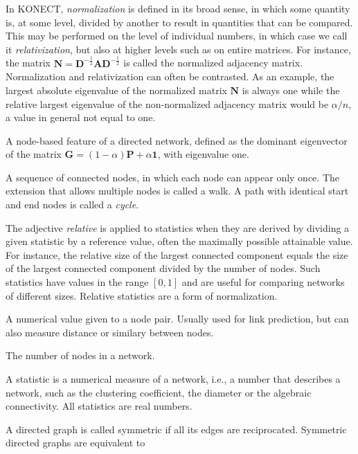 \documentclass{article}
\begin{document}
\begin{description}
    In KONECT, \emph{normalization} is defined in its broad sense, in
    which some quantity is, at some level, divided by another to result
    in quantities that can be compared.  This may be performed on the
    level of individual numbers, in which case we call it
    \emph{relativization}, but also at higher levels such as on entire
    matrices.  For instance, the matrix $\mathbf N = \mathbf D^{-\frac 1 2}
    \mathbf A \mathbf D^{-\frac 1 2}$ is called the normalized adjacency
    matrix.  Normalization and relativization can often be contrasted.
    As an example, the largest absolute eigenvalue of the normalized
    matrix $\mathbf N$ is always one while the relative largest
    eigenvalue of the non-normalized adjacency matrix would be $\alpha /
    n$, a value in general not equal to one.  
  \item[PageRank] 
    A node-based feature of a directed network, defined as the dominant
    eigenvector of the matrix $\mathbf G = (1-\alpha) \mathbf P +
    \alpha\mathbf 1$, with eigenvalue one. 
  \item[Path]
    A sequence of connected nodes, in which each node can appear only
    once.  The extension that allows multiple nodes is called a walk.  A
    path with identical start and end nodes is called a \emph{cycle}. 
  \item[Relative]
    The adjective \emph{relative} is applied to statistics when they are
    derived by dividing a given statistic by a reference value, often
    the maximally possible attainable value.  For instance, the relative
    size of the largest connected component equals the size of the
    largest connected component divided by the number of nodes.  Such
    statistics have values in the range $[0,1]$ and are useful for
    comparing networks of different sizes.  Relative statistics are a
    form of normalization. 
  \item[Score]
    A numerical value given to a node pair.  Usually used for link
    prediction, but can also measure distance or similary between
    nodes. 
  \item[Size]
    The number of nodes in a network.  
  \item[Statistic]
    A statistic is a numerical measure of a network, i.e., a number that
    describes a network, such as the clustering coefficient, the
    diameter or the algebraic connectivity.  All statistics are real
    numbers.   
  \item[Symmetric] A directed graph is called symmetric if all its edges
    are reciprocated.  Symmetric directed graphs are equivalent to

\end{description}
\end{document}

